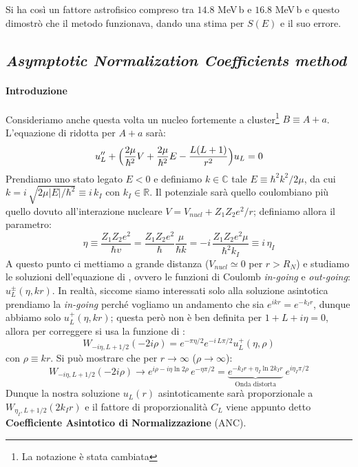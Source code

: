 \noindent Si ha così un fattore astrofisico compreso tra $14.8$ MeV$\,$b e $16.8$ MeV$\,$b e questo dimostrò che il metodo funzionava, dando una stima per $S(E)$ e il suo errore.
\newpage
\subsection{\textit{Asymptotic Normalization Coefficients method}}
\paragraph{Introduzione}
Consideriamo anche questa volta un nucleo fortemente a cluster\footnote{La notazione è stata cambiata} $B\equiv A+a$. L'equazione di \Sch{} ridotta per $A+a$ sarà:
$$u_L'' + \Bigl ( \frac{2\mu }{\hbar^2} V+ \frac{2\mu }{\hbar^2}E - \frac{L(L+1)}{r^2} \Bigr )u_L =0$$
Prendiamo uno stato legato $E<0$ e definiamo $k\in \mathbb{C}$ tale $E\equiv \hbar^2 k^2 / 2\mu$, da cui $k = i\, \sqrt{2\mu |E|/\hbar^2} \equiv i\,k_I$ con $k_I\in \mathbb{R}$. Il potenziale sarà quello coulombiano più quello dovuto all'interazione nucleare $V=V_{nucl} + Z_1Z_2 e^2 /r$; definiamo allora il parametro:
$$\eta \equiv \frac{Z_1Z_2 e^2}{\hbar v} = \frac{Z_1Z_2 e^2}{\hbar}\frac{\mu}{\hbar k} = - i \, \frac{Z_1Z_2 e^2\mu}{\hbar^2 k_I} \equiv i\, \eta_I$$
A questo punto ci mettiamo a grande distanza ($V_{nucl} \simeq 0$ per $r>R_N$) e studiamo le soluzioni dell'equazione di \Sch{}, ovvero le funzioni di Coulomb \textit{in-going} e \textit{out-going}: $u^\pm_L (\eta,kr)$. In realtà, siccome siamo interessati solo alla soluzione asintotica prendiamo la \textit{in-going} perché vogliamo un andamento che sia $e^{ikr}=e^{-k_I r}$, dunque abbiamo solo $u^+_L(\eta,kr)$; questa però non è ben definita per $1+L+i\eta =0$, allora per correggere si usa la funzione di \Wh{}:
$$W_{-i\eta,L+1/2}(-2i\rho) = e^{-\pi\eta/2}e^{-i\,L\pi/2} u^+_L(\eta,\rho)$$
con $\rho\equiv kr$. Si può mostrare che per $r\to\infty$ ($\rho\to\infty$):
$$W_{-i\eta,L+1/2}(-2i\rho) \to e^{i\rho-i\eta\ln{2\rho}}\, e^{-\eta\pi/2} = \underbrace{e^{-k_Ir + \eta_I \ln{2k_Ir}}}_\text{Onda distorta}\: e^{i\eta_I\pi/2}$$
Dunque la nostra soluzione $u_L(r)$ asintoticamente sarà proporzionale a $W_{\eta_I,L+1/2}(2k_I r)$ e il fattore di proporzionalità $C_L$ viene appunto detto \textbf{Coefficiente Asintotico di Normalizzazione} (ANC).


